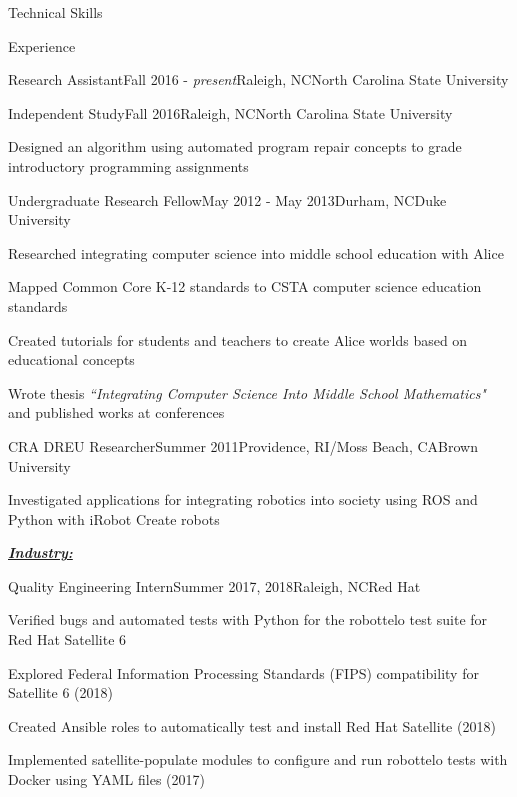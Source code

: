 \documentclass{resume} %
\begin{document}
\begin{rSection}{Technical Skills}
\begin{rSection}{Experience}
\begin{pSubsection}{\small Research Assistant}{\small Fall 2016 - \textit{present}}{\small Raleigh, NC}{\small North Carolina State University}
\end{pSubsection}
\vspace{-10pt}

\begin{pSubsection}{\small Independent Study}{\small Fall 2016}{\small Raleigh, NC}{\small North Carolina State University}
\item {\small Designed an algorithm using automated program repair concepts to grade introductory programming assignments}
\end{pSubsection}
\vspace{-10pt}

\begin{pSubsection}{\small Undergraduate Research Fellow}{\small May 2012 - May 2013}{\small Durham, NC}{\small Duke University}
\item {\small Researched integrating computer science into middle school education with Alice}
\item {\small Mapped Common Core K-12 standards to CSTA computer science education standards}
\item {\small Created tutorials for students and teachers to create Alice worlds based on educational concepts}
\item {\small Wrote thesis \textit{``Integrating Computer Science Into Middle School Mathematics"} and published works at conferences}
\end{pSubsection}
\vspace{-10pt}

\begin{pSubsection}{\small CRA DREU Researcher}{\small Summer 2011}{\small Providence, RI/Moss Beach, CA}{\small Brown University}
\item {\small Investigated applications for integrating robotics into society using ROS and Python with iRobot Create robots}
\end{pSubsection}
\vspace{-8pt}

\underline{\textbf{\textit{Industry:}}}
\vspace{-7pt}

\begin{pSubsection}{\small Quality Engineering Intern}{\small Summer 2017, 2018}{\small Raleigh, NC}{\small Red Hat}
 \item {\small Verified bugs and automated tests with Python for the robottelo test suite for Red Hat Satellite 6}
 \item {\small Explored Federal Information Processing Standards (FIPS) compatibility for Satellite 6 (2018)}
 \item {\small Created Ansible roles to automatically test and install Red Hat Satellite (2018)}
 \item {\small Implemented satellite-populate modules to configure and run robottelo tests with Docker using YAML files (2017)}
\end{pSubsection}
\vspace{-10pt}


\end{rSection}
\end{rSection}
\end{document}
